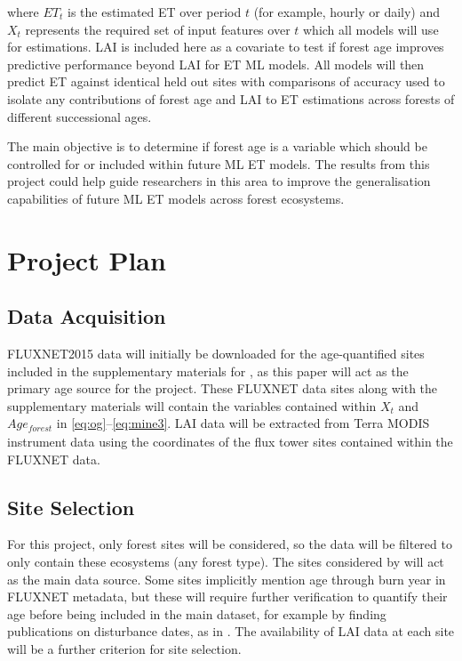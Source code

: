 where $ET_t$ is the estimated ET over period $t$ (for example, hourly or daily) and $X_t$ represents the required set of input features over $t$ which all models will use for estimations. LAI is included here as a covariate to test if forest age improves predictive performance beyond LAI for ET ML models. All models will then predict ET against identical held out sites with comparisons of accuracy used to isolate any contributions of forest age and LAI to ET estimations across forests of different successional ages.
\par The main objective is to determine if forest age is a variable which should be controlled for or included within future ML ET models. The results from this project could help guide researchers in this area to improve the generalisation capabilities of future ML ET models across forest ecosystems.

\section{Project Plan} %
\subsection{Data Acquisition}
FLUXNET2015 data will initially be downloaded for the age-quantified sites included in the supplementary materials for \textcite{besnard2018}, as this paper will act as the primary age source for the project. These FLUXNET data sites along with the supplementary materials will contain the variables contained within $X_t$ and $Age_{\textit{forest}}$ in \eqref{eq:og}–\eqref{eq:mine3}. LAI data will be extracted from Terra MODIS instrument data \parencite{myneni2015} using the coordinates of the flux tower sites contained within the FLUXNET data.

\subsection{Site Selection}
For this project, only forest sites will be considered, so the data will be filtered to only contain these ecosystems (any forest type). The sites considered by \textcite{besnard2018} will act as the main data source. Some sites implicitly mention age through burn year in FLUXNET metadata, but these will require further verification to quantify their age before being included in the main dataset, for example by finding publications on disturbance dates, as in \textcite{besnard2018}. The availability of LAI data at each site will be a further criterion for site selection.

